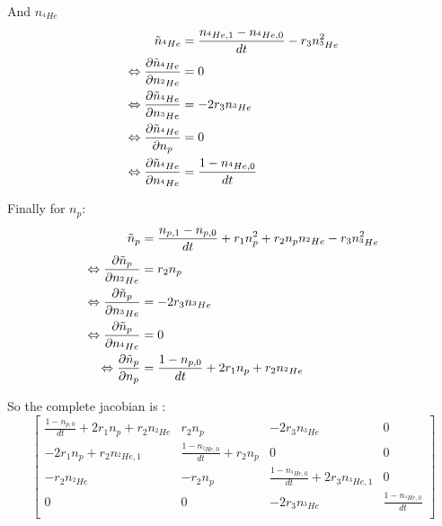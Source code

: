 \documentclass[a4paper,12pt]{article}
\begin{document}
And $n_{^4He}$
\begin{equation*}
    \centering
    \begin{split}
        \tilde{n}_{^4He} &= \frac{n_{^4He, 1} - n_{^4He, 0}}{dt} - r_3n_{^3He}^2\\
        \Leftrightarrow \frac{\partial \tilde{n}_{^4He}}{\partial n_{^2He}} &= 0\\
        \Leftrightarrow \frac{\partial \tilde{n}_{^4He}}{\partial n_{^3He}} &= -2r_3n_{^3He}\\
        \Leftrightarrow \frac{\partial \tilde{n}_{^4He}}{\partial n_p} &= 0\\
        \Leftrightarrow \frac{\partial \tilde{n}_{^4He}}{\partial n_{^4He}} &= \frac{1 - n_{^4He, 0}}{dt}\\
    \end{split}
\end{equation*}

Finally for $n_p$:
\begin{equation*}
    \centering
    \begin{split}
        \tilde{n}_{p} &= \frac{n_{p, 1} - n_{p, 0}}{dt} + r_1n_p^2 + r_2 n_pn_{^2He} - r_3n_{^3He}^2\\
        \Leftrightarrow \frac{\partial \tilde{n}_{p}}{\partial n_{^2He}} &= r_2n_p\\
        \Leftrightarrow \frac{\partial \tilde{n}_{p}}{\partial n_{^3He}} &= - 2r_3n_{^3He}\\
        \Leftrightarrow \frac{\partial \tilde{n}_{p}}{\partial n_{^4He}} &= 0\\
        \Leftrightarrow \frac{\partial \tilde{n}_{p}}{\partial n_{p}} &= \frac{1 - n_{p, 0}}{dt} + 2r_1n_p + r_2n_{^2He}\\
    \end{split}
\end{equation*}

So the complete jacobian is :
\begin{equation}
\begin{bmatrix}
    \frac{1 - n_{p, 0}}{dt} + 2r_1n_p + r_2n_{^2He} &  r_2n_p & - 2r_3n_{^3He} &  0\\
    -2r_1n_p + r_2n_{^2He, 1} & \frac{1 - n_{^2He, 0}}{dt} + r_2n_p & 0 & 0\\
    - r_2n_{^2He} & -r_2n_p & \frac{1 - n_{^3He, 0}}{dt} + 2r_3n_{^3He, 1} & 0\\
    0 & 0 & -2r_3n_{^3He} & \frac{1 - n_{^4He, 0}}{dt}\\
\end{bmatrix}
\end{equation}
\end{document}
